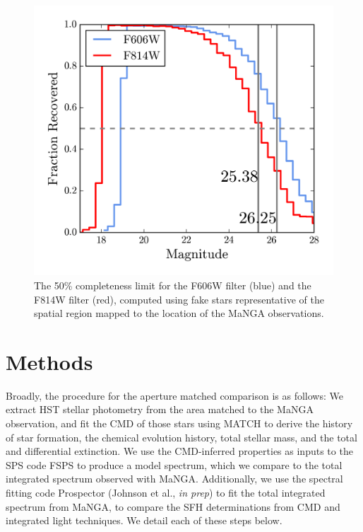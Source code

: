 \documentclass[preprint2]{aastex62}
\begin{document}
\begin{figure}
  \begin{center}
    \includegraphics[width=\linewidth]{figs/f3.png}
    \caption{The 50\% completeness limit for the F606W filter (blue) and the F814W filter (red), computed using fake stars representative of the spatial region mapped to the location of the MaNGA observations.}
    \label{fig:comp}
  \end{center}
\end{figure}


\section{Methods}\label{sec:methods}

Broadly, the procedure for the aperture matched comparison is as follows: We extract HST stellar photometry from the area matched to the MaNGA observation, and fit the CMD of those stars using MATCH \citep{Dolphin+2002} to derive the history of star formation, the chemical evolution history, total stellar mass, and the total and differential extinction. We use the CMD-inferred properties as inputs to the SPS code FSPS \citep{Conroy+2009} to produce a model spectrum, which we compare to the total integrated spectrum observed with MaNGA. Additionally, we use the spectral fitting code Prospector (Johnson et al., \emph{in prep}) to fit the total integrated spectrum from MaNGA, to compare the SFH determinations from CMD and integrated light techniques. We detail each of these steps below.
\end{document}
